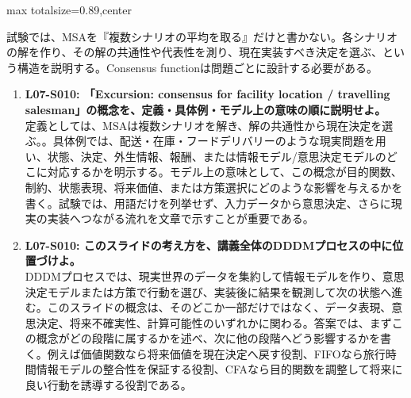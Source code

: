 \begin{minipage}[t]{0.58\textwidth}
\begin{adjustbox}{max totalsize={\textwidth}{0.89\textheight},center}
\begin{minipage}{\textwidth}
試験では、MSAを『複数シナリオの平均を取る』だけと書かない。各シナリオの解を作り、その解の共通性や代表性を測り、現在実装すべき決定を選ぶ、という構造を説明する。Consensus functionは問題ごとに設計する必要がある。\par{}\begin{enumerate}\item \textbf{L07-S010: 「Excursion: consensus for facility location / travelling salesman」の概念を、定義・具体例・モデル上の意味の順に説明せよ。}\\定義としては、MSAは複数シナリオを解き、解の共通性から現在決定を選ぶ。。具体例では、配送・在庫・フードデリバリーのような現実問題を用い、状態、決定、外生情報、報酬、または情報モデル/意思決定モデルのどこに対応するかを明示する。モデル上の意味として、この概念が目的関数、制約、状態表現、将来価値、または方策選択にどのような影響を与えるかを書く。試験では、用語だけを列挙せず、入力データから意思決定、さらに現実の実装へつながる流れを文章で示すことが重要である。\item \textbf{L07-S010: このスライドの考え方を、講義全体のDDDMプロセスの中に位置づけよ。}\\DDDMプロセスでは、現実世界のデータを集約して情報モデルを作り、意思決定モデルまたは方策で行動を選び、実装後に結果を観測して次の状態へ進む。このスライドの概念は、そのどこか一部だけではなく、データ表現、意思決定、将来不確実性、計算可能性のいずれかに関わる。答案では、まずこの概念がどの段階に属するかを述べ、次に他の段階へどう影響するかを書く。例えば価値関数なら将来価値を現在決定へ戻す役割、FIFOなら旅行時間情報モデルの整合性を保証する役割、CFAなら目的関数を調整して将来に良い行動を誘導する役割である。\end{enumerate}
\end{minipage}
\end{adjustbox}
\end{minipage}


